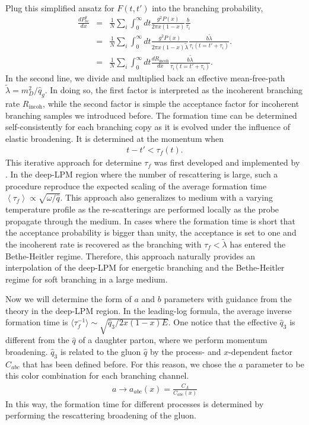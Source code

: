 Plug this simplified ansatz for $F(t, t')$ into the branching probability,
\begin{eqnarray}
\frac{dP^{a}_{bc}}{dx} &=& \frac{1}{N}\sum_i \int_0^\infty dt \frac{g^2 P(x)}{2\pi x (1-x)} \frac{b}{\tau_i} \\  
 &=& \frac{1}{N}\sum_i \int_0^\infty dt \frac{g^2 P(x)}{2\pi x (1-x) \tilde{\lambda}} \frac{b \tilde{\lambda}}{\tau_i(t=t'+\tau_i)}.\\
  &=& \frac{1}{N}\sum_i \int_0^\infty dt \frac{dR_{\textrm{incoh}}}{dx} \frac{b \tilde{\lambda}}{\tau_i(t=t'+\tau_i)}.
\end{eqnarray}
In the second line, we divide and multiplied back an effective mean-free-path $\tilde{\lambda} = m_D^2/\hat{q}_g$.
In doing so, the first factor is interpreted as the incoherent branching rate $R_{\textrm{incoh}}$, while the second factor is simple the acceptance factor for incoherent branching samples we introduced before.
The formation time can be determined self-consistently for each branching copy as it is evolved under the influence of elastic broadening.
It is determined at the momentum when
\begin{eqnarray}
t - t' < \tau_f(t). 
\end{eqnarray}
This iterative approach for determine $\tau_f$ was first developed and implemented by \cite{Zapp:2011ya}.
In the deep-LPM region where the number of rescattering is large, such a procedure reproduce the expected scaling of the average formation time $\left\langle\tau_f\right\rangle \propto \sqrt{\omega/\hat{q}}$.
This approach also generalizes to medium with a varying temperature profile as the re-scatterings are performed locally as the probe propagate through the medium.
In cases where the formation time is short that the acceptance probability is bigger than unity, the acceptance is set to one and the incoherent rate is recovered as the branching with $\tau_f < \tilde{\lambda}$ has entered the Bethe-Heitler regime.
Therefore, this approach naturally provides an interpolation of the deep-LPM for energetic branching and the Bethe-Heitler regime for soft branching in a large medium.

Now we will determine the form of $a$ and $b$ parameters with guidance from the theory in the deep-LPM region.
In the leading-log formula, the average inverse formation time is $\langle\tau_f^{-1}\rangle \sim \sqrt{\hat{q}_3 / 2x(1-x)E}$. 
One notice that the effective $\hat{q}_3$ is different from the $\hat{q}$ of a daughter parton, where we perform momentum broadening.
$\hat{q}_3$ is related to the gluon $\hat{q}$ by the process- and $x$-dependent factor $C_{abc}$ that has been defined before.
For this reason, we chose the $a$ parameter to be this color combination for each branching channel.
\begin{eqnarray}
a \rightarrow a_{abc}(x) = \frac{C_A}{C_{abc}(x)}
\end{eqnarray}
In this way, the formation time for different processes is determined by performing the rescattering broadening of the gluon.

